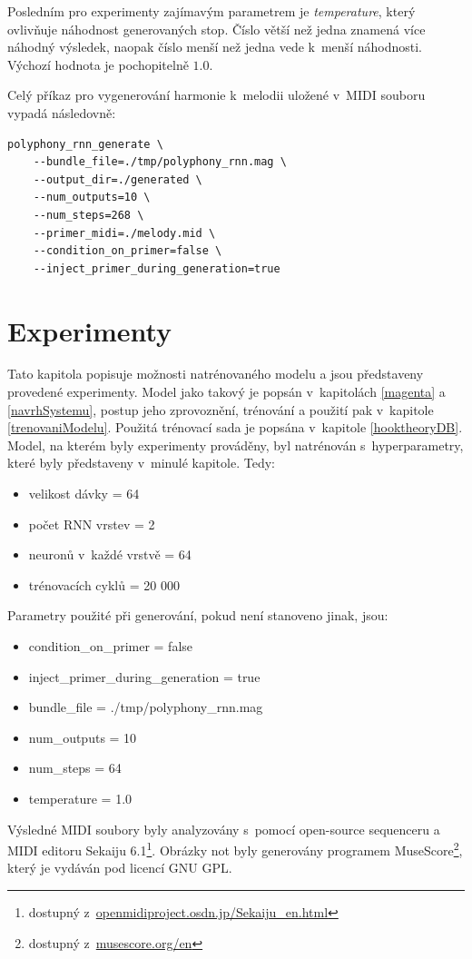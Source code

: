 \par
Posledním pro experimenty zajímavým parametrem je \emph{temperature},
který ovlivňuje náhodnost generovaných stop.
Číslo větší než jedna znamená více náhodný výsledek,
naopak číslo menší než jedna vede k~menší náhodnosti.
Výchozí hodnota je pochopitelně $1.0$.
\par

Celý příkaz pro vygenerování harmonie k~melodii
uložené v~MIDI souboru vypadá následovně:

\begin{verbatim}
polyphony_rnn_generate \
    --bundle_file=./tmp/polyphony_rnn.mag \
    --output_dir=./generated \
    --num_outputs=10 \
    --num_steps=268 \
    --primer_midi=./melody.mid \
    --condition_on_primer=false \
    --inject_primer_during_generation=true    
\end{verbatim}

\chapter{Experimenty}
\label{experimenty}
Tato kapitola popisuje možnosti natrénovaného modelu 
a jsou představeny provedené experimenty.
Model jako takový je popsán v~kapitolách \ref{magenta} a \ref{navrhSystemu},
postup jeho zprovoznění, trénování a použití pak v~kapitole \ref{trenovaniModelu}.
Použitá trénovací sada je popsána v~kapitole \ref{hooktheoryDB}.
Model, na kterém byly experimenty prováděny, 
byl natrénován s~hyperparametry, které byly představeny v~minulé kapitole.
Tedy:
\begin{itemize}
    \item velikost dávky = 64
    \item počet RNN vrstev = 2
    \item neuronů v~každé vrstvě = 64
    \item trénovacích cyklů = 20 000
\end{itemize}
Parametry použité při generování, pokud není stanoveno jinak, jsou:
\begin{itemize}
    \item condition\_on\_primer = false
    \item inject\_primer\_during\_generation = true
    \item bundle\_file = ./tmp/polyphony\_rnn.mag
    \item num\_outputs = 10 
    \item num\_steps = 64
    \item temperature = 1.0
\end{itemize}
Výsledné MIDI soubory byly analyzovány s~pomocí open-source 
sequenceru a MIDI editoru Sekaiju 6.1\footnote{dostupný z~\url{openmidiproject.osdn.jp/Sekaiju_en.html}}.
Obrázky not byly generovány programem MuseScore\footnote{dostupný z~\url{musescore.org/en}}, 
který je vydáván pod licencí GNU GPL.

